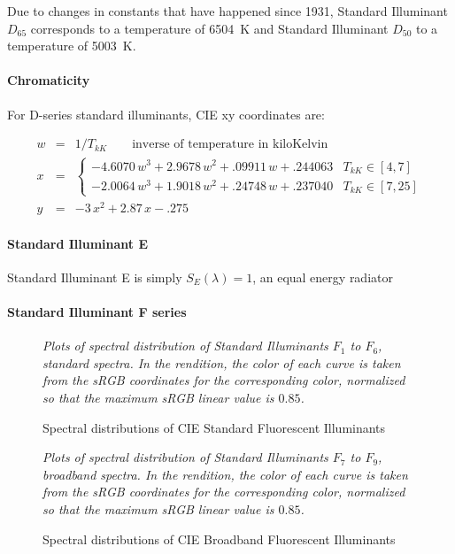 Due to changes in constants that have happened since 1931, Standard Illuminant $D_{65}$
corresponds to a temperature of \SI{6504}{\kelvin} and Standard Illuminant $D_{50}$
to a temperature of \SI{5003}{\kelvin}.

\paragraph{Chromaticity}
For D-series standard illuminants, \gls{CIE} xy coordinates are:

\begin{equation}
\begin{array}{rcl}
w & = & 1/T_{kK} \qquad \text{inverse of temperature in kiloKelvin}  \\
x & = & \begin{cases}
         - 4.6070\,w^3 + 2.9678 \,w^2 + .09911\,w + .244063  & T_{kK} \in [4, 7] \\
         - 2.0064\,w^3 + 1.9018\,w^2  +  .24748\,w + .237040 & T_{kK} \in [7, 25]
    \end{cases} \\
y & = & -3\,x^2  + 2.87\,x - .275
\end{array}
\end{equation}


\paragraph{Standard Illuminant E}

Standard Illuminant E is simply $S_E(\lambda) = 1$, an equal energy radiator

\paragraph{Standard Illuminant F series}

\begin{figure}
\small
\centering

\caption{Spectral distributions of CIE Standard Fluorescent Illuminants}
\label{fig:illumfspectrastd}
\vskip 1mm
{\footnotesize\it Plots of spectral distribution of
Standard Illuminants $F_1$ to $F_6$, standard spectra.
In the rendition, the color of each curve is taken from the
sRGB coordinates for the corresponding color,
normalized so that the maximum sRGB linear value is $0.85$.
}
\end{figure}

\begin{figure}
{
\small
\centering

\caption{Spectral distributions of CIE Broadband Fluorescent Illuminants}
\label{fig:illumfspectrabroad}
}
\vskip 1mm
{\footnotesize\it Plots of spectral distribution of
Standard Illuminants $F_7$ to $F_9$, broadband spectra.
In the rendition, the color of each curve is taken from the
sRGB coordinates for the corresponding color,
normalized so that the maximum sRGB linear value is $0.85$.
}
\end{figure}

